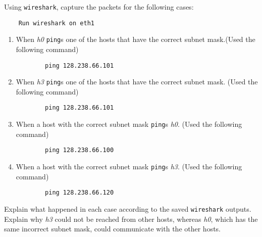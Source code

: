 \documentclass{UTNetLab}
\begin{document}
    Using \lstinline{wireshark}, capture the packets for the following cases: 
    
    \begin{lstlisting}
    Run wireshark on eth1
    \end{lstlisting}
    
    \begin{enumerate}
        \item When \textit{h0} \lstinline{ping}s one of the hosts that have the correct subnet mask.(Used the following command)
        
        \begin{lstlisting}
        ping 128.238.66.101
        \end{lstlisting}
        
        \item When \textit{h3} \lstinline{ping}s one of the hosts that have the correct subnet mask. (Used the following command)
        
        \begin{lstlisting}
        ping 128.238.66.101
        \end{lstlisting}
        
               \item When a host with the correct subnet mask \lstinline{ping}s \textit{h0}. (Used the following command)
        
        \begin{lstlisting}
        ping 128.238.66.100
        \end{lstlisting}
        
        \item When a host with the correct subnet mask \lstinline{ping}s \textit{h3}. (Used the following command)

        \begin{lstlisting}
        ping 128.238.66.120
        \end{lstlisting}
        
    \end{enumerate}
    
    \begin{report}
        \item Explain what happened in each case according to the saved \lstinline{wireshark} outputs.
            Explain why \textit{h3} could not be reached from other hosts, whereas \textit{h0}, which has the same incorrect subnet mask, could communicate with the other hosts.
    \end{report}
\end{document}
